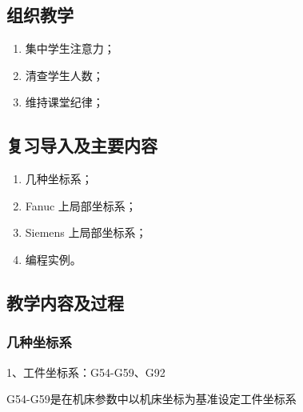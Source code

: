 \jxhj{%
	}

\makeshouye %

\subsection{组织教学}
\begin{enumerate}[\hspace{2em}1、]
	\item 集中学生注意力；
	\item 清查学生人数；
	\item 维持课堂纪律；
\end{enumerate}

\subsection{复习导入及主要内容}
\begin{enumerate}[1、]
\item 几种坐标系；
\item Fanuc 上局部坐标系；
\item Siemens 上局部坐标系；
\item 编程实例。
\end{enumerate}

\subsection{教学内容及过程}
\subsubsection{几种坐标系}
	1、工件坐标系：G54-G59、G92
	
	G54-G59是在机床参数中以机床坐标为基准设定工件坐标系

